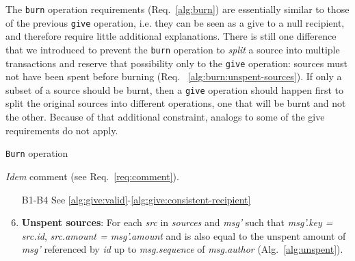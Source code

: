 \documentclass[sigplan,screen,10pt]{acmart}
\newcommand\idemcomment[0]{
\begin{flushleft}
{\color{commentgray} \textit{Idem} comment (see Req.~\ref{req:comment}).}
\end{flushleft}}
\begin{document}
The \texttt{burn} operation requirements (Req.~\ref{alg:burn}) are essentially similar to those of the previous \texttt{give} operation, i.e. they can be seen as a give to a null recipient, and therefore require little additional explanations. There is still one difference that we introduced to prevent  the \texttt{burn} operation to \textit{split} a source into multiple transactions and reserve that possibility only to the \texttt{give} operation: sources must not have been spent before burning (Req. ~\ref{alg:burn:unspent-sources}). If only a subset of a source should be burnt, then a \texttt{give} operation should happen first to split the original sources into different operations, one that will be burnt and not the other. Because of that additional constraint, analogs to some of the give requirements do not apply.

\begin{invariants}[hbp]
    \caption{\texttt{Burn} operation}
    \label{alg:burn}
   \idemcomment
    \begin{enumerate} [label={B\arabic*},leftmargin=1cm]
         \setcounter{enumi}{4}
          
          \item[B1-B4] See  \ref{alg:give:valid}-\ref{alg:give:consistent-recipient}
          
          \item \label{alg:burn:unspent-sources} \textbf{Unspent sources}: For each \textit{src} in \textit{sources} and \textit{msg'} such that \textit{msg'.key = src.id}, \textit{src.amount = msg'.amount} and is also equal to the unspent amount of \textit{msg'} referenced by \textit{id} up to \textit{msg.sequence} of \textit{msg.author} (Alg.~\ref{alg:unspent}).
    \end{enumerate}
\end{invariants}
\end{document}
